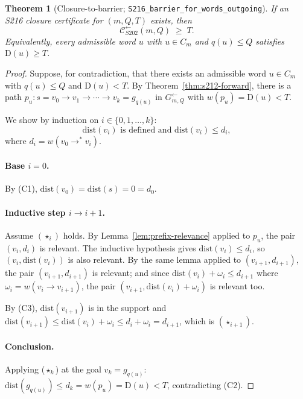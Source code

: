\documentclass[11pt,a4paper]{article}
\theoremstyle{plain}
\newtheorem{theorem}{Theorem}[section]
\theoremstyle{definition}
\newcommand{\defect}{\mathrm{D}}
\newcommand{\Cback}{\mathcal{C}^{\!\leftarrow}_{S202}}
\newcommand{\InvG}{G^{\!\leftarrow}}
\begin{document}
\begin{theorem}[Closure-to-barrier; \texttt{S216\_barrier\_for\_words\_outgoing}]
\label{thm:closure-to-barrier}
If an S216 closure certificate for $(m, Q, T)$ exists, then
\[
  \Cback(m, Q) \;\ge\; T.
\]
Equivalently, every admissible word $u$ with $u \in C_m$ and
$q(u) \le Q$ satisfies $\defect(u) \ge T$.
\end{theorem}

\begin{proof}
Suppose, for contradiction, that there exists an admissible word
$u \in C_m$ with $q(u) \le Q$ and $\defect(u) < T$.
By Theorem~\ref{thm:s212-forward}, there is a path
$p_u : s = v_0 \to v_1 \to \cdots \to v_k = g_{q(u)}$ in
$\InvG_{m, Q}$ with $w(p_u) = \defect(u) < T$.

We show by induction on $i \in \{0, 1, \dots, k\}$:
\[
  \mathrm{dist}(v_i) \text{ is defined and } \mathrm{dist}(v_i) \le d_i,
  \tag{$\star_i$}\label{eq:dist-ind}
\]
where $d_i = w(v_0 \to^{*} v_i)$.

\paragraph{Base $i = 0$.}
By (C1), $\mathrm{dist}(v_0) = \mathrm{dist}(s) = 0 = d_0$.

\paragraph{Inductive step $i \to i+1$.}
Assume $(\star_i)$ holds. By Lemma~\ref{lem:prefix-relevance} applied
to $p_u$, the pair $(v_i, d_i)$ is relevant. The inductive hypothesis
gives $\mathrm{dist}(v_i) \le d_i$, so $(v_i, \mathrm{dist}(v_i))$ is
also relevant. By the same lemma applied to $(v_{i+1}, d_{i+1})$,
the pair $(v_{i+1}, d_{i+1})$ is relevant; and since
$\mathrm{dist}(v_i) + \omega_i \le d_{i+1}$ where
$\omega_i = w(v_i \to v_{i+1})$, the pair
$(v_{i+1}, \mathrm{dist}(v_i) + \omega_i)$ is relevant too.

By (C3), $\mathrm{dist}(v_{i+1})$ is in the support and
$\mathrm{dist}(v_{i+1}) \le \mathrm{dist}(v_i) + \omega_i
                          \le d_i + \omega_i = d_{i+1}$,
which is $(\star_{i+1})$.

\paragraph{Conclusion.}
Applying ($\star_k$) at the goal $v_k = g_{q(u)}$:
$\mathrm{dist}(g_{q(u)}) \le d_k = w(p_u) = \defect(u) < T$,
contradicting (C2).
\end{proof}
\end{document}
